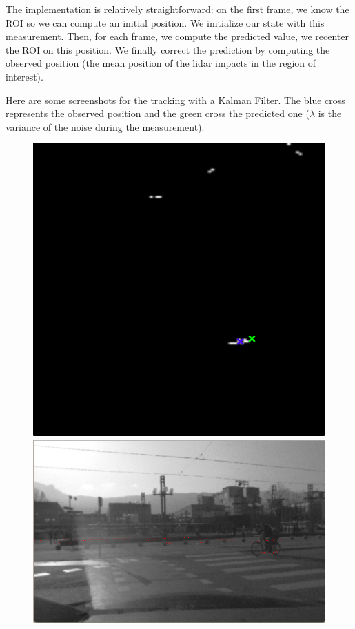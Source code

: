 \documentclass[a4paper,11pt]{article}
\begin{document}
The implementation is relatively straightforward: on the first frame, we know
the ROI so we can compute an initial position. We initialize our state with this
measurement. Then, for each frame, we compute the predicted value, we recenter
the ROI on this position. We finally correct the prediction by computing the
observed position (the mean position of the lidar impacts in the region of
interest).

Here are some screenshots for the tracking with a Kalman Filter. The blue cross
represents the observed position and the green cross the predicted one ($
\lambda $ is the variance of the noise during the measurement).

\begin{figure}[H]
    \centering
    \includegraphics[scale=0.3]{pic/tracking1.png}
    \includegraphics[scale=0.4]{pic/tracking1-left.png} \\

\end{figure}
\end{document}
